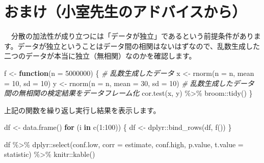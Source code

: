 \documentclass[]{tufte-handout}
\newenvironment{Shaded}{}{}
\newcommand{\AttributeTok}[1]{\textcolor[rgb]{0.49,0.56,0.16}{#1}}
\newcommand{\CommentTok}[1]{\textcolor[rgb]{0.38,0.63,0.69}{\textit{#1}}}
\newcommand{\ControlFlowTok}[1]{\textcolor[rgb]{0.00,0.44,0.13}{\textbf{#1}}}
\newcommand{\DecValTok}[1]{\textcolor[rgb]{0.25,0.63,0.44}{#1}}
\newcommand{\FunctionTok}[1]{\textcolor[rgb]{0.02,0.16,0.49}{#1}}
\newcommand{\NormalTok}[1]{#1}
\newcommand{\OtherTok}[1]{\textcolor[rgb]{0.00,0.44,0.13}{#1}}
\newcommand{\SpecialCharTok}[1]{\textcolor[rgb]{0.25,0.44,0.63}{#1}}
\begin{document}
\newpage

\hypertarget{ux304aux307eux3051ux5c0fux5ba4ux5148ux751fux306eux30a2ux30c9ux30d0ux30a4ux30b9ux304bux3089}{%
\section{\texorpdfstring{\textbf{おまけ}（小室先生のアドバイスから）}{おまけ（小室先生のアドバイスから）}}\label{ux304aux307eux3051ux5c0fux5ba4ux5148ux751fux306eux30a2ux30c9ux30d0ux30a4ux30b9ux304bux3089}}

　分散の加法性が成り立つには「データが独立」であるという前提条件があります。データが独立ということはデータ間の相関はないはずなので、乱数生成した二つのデータが本当に独立（無相関）なのかを確認します。

\begin{Shaded}
\begin{Highlighting}[numbers=left,,]
\NormalTok{f }\OtherTok{\textless{}{-}} \ControlFlowTok{function}\NormalTok{(}\AttributeTok{n =} \DecValTok{5000000}\NormalTok{) \{}
  \CommentTok{\# 乱数生成したデータ}
\NormalTok{  x }\OtherTok{\textless{}{-}} \FunctionTok{rnorm}\NormalTok{(}\AttributeTok{n =}\NormalTok{ n, }\AttributeTok{mean =} \DecValTok{10}\NormalTok{, }\AttributeTok{sd =} \DecValTok{10}\NormalTok{)}
\NormalTok{  y }\OtherTok{\textless{}{-}} \FunctionTok{rnorm}\NormalTok{(}\AttributeTok{n =}\NormalTok{ n, }\AttributeTok{mean =} \DecValTok{30}\NormalTok{, }\AttributeTok{sd =} \DecValTok{10}\NormalTok{)}
  \CommentTok{\# 乱数生成したデータ間の無相関の検定結果をデータフレーム化}
  \FunctionTok{cor.test}\NormalTok{(x, y) }\SpecialCharTok{\%\textgreater{}\%}\NormalTok{ broom}\SpecialCharTok{::}\FunctionTok{tidy}\NormalTok{()}
\NormalTok{\}}
\end{Highlighting}
\end{Shaded}

上記の関数を繰り返し実行し結果を表示します。

\begin{Shaded}
\begin{Highlighting}[numbers=left,,]
\NormalTok{df }\OtherTok{\textless{}{-}} \FunctionTok{data.frame}\NormalTok{()}
\ControlFlowTok{for}\NormalTok{ (i }\ControlFlowTok{in} \FunctionTok{c}\NormalTok{(}\DecValTok{1}\SpecialCharTok{:}\DecValTok{100}\NormalTok{)) \{}
\NormalTok{  df }\OtherTok{\textless{}{-}}\NormalTok{ dplyr}\SpecialCharTok{::}\FunctionTok{bind\_rows}\NormalTok{(df, }\FunctionTok{f}\NormalTok{())}
\NormalTok{\}}

\NormalTok{df }\SpecialCharTok{\%\textgreater{}\%} 
\NormalTok{  dplyr}\SpecialCharTok{::}\FunctionTok{select}\NormalTok{(conf.low, }\AttributeTok{corr =}\NormalTok{ estimate, conf.high,}
\NormalTok{                p.value, }\AttributeTok{t.value =}\NormalTok{ statistic) }\SpecialCharTok{\%\textgreater{}\%} 
\NormalTok{  knitr}\SpecialCharTok{::}\FunctionTok{kable}\NormalTok{()}
\end{Highlighting}
\end{Shaded}
\end{document}
